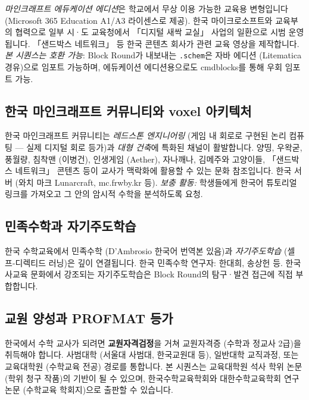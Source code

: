 \documentclass[12pt,a4paper]{scrartcl}
\newcommand{\acc}[1]{\textcolor{accent}{\textbf{#1}}}
\begin{document}
\emph{마인크래프트 에듀케이션 에디션}은 학교에서 무상 이용 가능한 교육용 변형입니다 (Microsoft 365 Education A1/A3 라이센스로 제공). 한국 마이크로소프트와 교육부의 협력으로 일부 시·도 교육청에서 「디지털 새싹 교실」 사업의 일환으로 시범 운영됩니다. 「샌드박스 네트워크」 등 한국 콘텐츠 회사가 관련 교육 영상을 제작합니다. \emph{본 시퀀스는 호환 가능}: Block Round가 내보내는 \texttt{.schem}은 자바 에디션 (Litematica 경유)으로 임포트 가능하며, 에듀케이션 에디션용으로도 cmdblocks를 통해 우회 임포트 가능.

\subsection{한국 마인크래프트 커뮤니티와 voxel 아키텍처}

한국 마인크래프트 커뮤니티는 \emph{레드스톤 엔지니어링} (게임 내 회로로 구현된 논리 컴퓨팅 --- 실제 디지털 회로 등가)과 \emph{대형 건축}에 특화된 채널이 활발합니다. 양띵, 우왁굳, 풍월량, 침착맨 (이병건), 인생게임 (Aether), 자나깨나, 김메주와 고양이들, 「샌드박스 네트워크」 콘텐츠 등이 교사가 맥락화에 활용할 수 있는 문화 참조입니다. 한국 서버 (와치 마크 Lunarcraft, mc.frwby.kr 등). \emph{보충 활동:} 학생들에게 한국어 튜토리얼 링크를 가져오고 그 안의 암시적 수학을 분석하도록 요청.

\subsection{민족수학과 자기주도학습}

한국 수학교육에서 민족수학 (D'Ambrosio 한국어 번역본 있음)과 \emph{자기주도학습} (셀프-디렉티드 러닝)은 깊이 연결됩니다. 한국 민족수학 연구자: 한대희, 송상헌 등. 한국 사교육 문화에서 강조되는 자기주도학습은 Block Round의 탐구·발견 접근에 직접 부합합니다.

\subsection{교원 양성과 PROFMAT 등가}

한국에서 수학 교사가 되려면 \acc{교원자격검정}을 거쳐 교원자격증 (수학과 정교사 2급)을 취득해야 합니다. 사범대학 (서울대 사범대, 한국교원대 등), 일반대학 교직과정, 또는 교육대학원 (수학교육 전공) 경로를 통합니다. 본 시퀀스는 교육대학원 석사 학위 논문 (학위 청구 작품)의 기반이 될 수 있으며, 한국수학교육학회와 대한수학교육학회 연구 논문 (수학교육 학회지)으로 출판할 수 있습니다.

\end{document}
